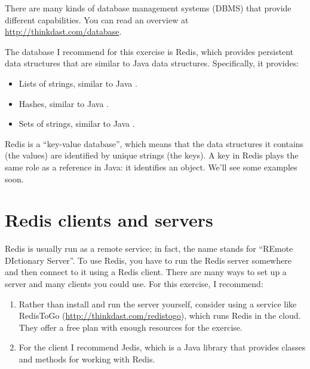 \documentclass[12pt]{book}
\theoremstyle{exercise}
\begin{document}

There are many kinds of database management systems (DBMS) that provide
different capabilities. You can read an overview at
\url{http://thinkdast.com/database}.


The database I recommend for this exercise is Redis, which provides
persistent data structures that are similar to Java data structures.
Specifically, it provides:

\begin{itemize}

\item
  Lists of strings, similar to Java .

\item
  Hashes, similar to Java .

\item
  Sets of strings, similar to Java .

\end{itemize}

Redis is a ``key-value database'', which means that the data structures
it contains (the values) are identified by unique strings (the keys). A
key in Redis plays the same role as a reference in Java: it identifies
an object. We'll see some examples soon.



\section{Redis clients and servers}
\label{redis-clients-and-servers}


Redis is usually run as a remote service; in fact, the name stands for
``REmote DIctionary Server''. To use Redis, you have to run the Redis
server somewhere and then connect to it using a Redis client. There are
many ways to set up a server and many clients you could use. For this
exercise, I recommend:

\begin{enumerate}

\item
  Rather than install and run the server yourself, consider using a
  service like RedisToGo (\url{http://thinkdast.com/redistogo}), which runs
  Redis in the cloud. They offer a free plan with enough resources for
  the exercise.

\item
  For the client I recommend Jedis, which is a Java library that
  provides classes and methods for working with Redis.

\end{enumerate}
\end{document}
